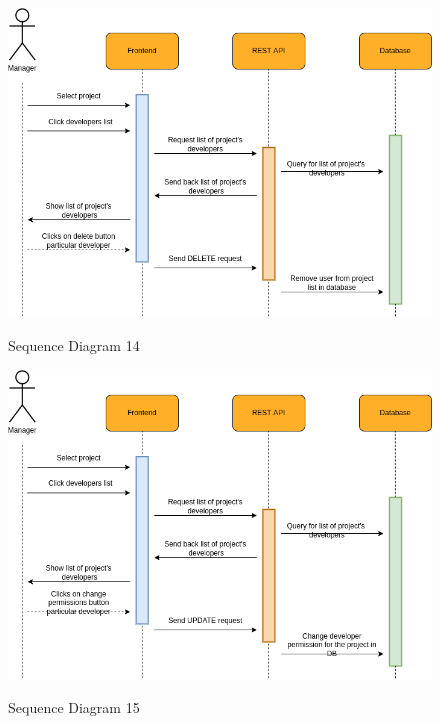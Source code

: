 \begin{figure}[H]
    \centering
    \caption{Sequence Diagram 14}
    \includegraphics[scale=0.5]{./diagrams/sequence/seq-14.png}
    \label{fig:seq-14}
    
\end{figure}


\begin{figure}[H]
    \centering
    \caption{Sequence Diagram 15}
    \includegraphics[scale=0.5]{./diagrams/sequence/seq-15.png}
    \label{fig:seq-15}
    
\end{figure}


